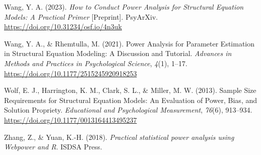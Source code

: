 \documentclass[
  letterpaper,
  DIV=11,
  numbers=noendperiod]{scrartcl}
\newlength{\cslhangindent}
\newenvironment{CSLReferences}[2] %
 {\begin{list}{}{%
  \setlength{\itemindent}{0pt}
  \setlength{\leftmargin}{0pt}
  \setlength{\parsep}{0pt}
  \ifodd #1
   \setlength{\leftmargin}{\cslhangindent}
   \setlength{\itemindent}{-1\cslhangindent}
  \fi
  \setlength{\itemsep}{#2\baselineskip}}}
 {\end{list}}
\begin{document}
\begin{CSLReferences}{1}{0}
Wang, Y. A. (2023). \emph{How to {Conduct Power Analysis} for
{Structural Equation Models}: {A Practical Primer}} {[}Preprint{]}.
PsyArXiv. \url{https://doi.org/10.31234/osf.io/4n3uk}

Wang, Y. A., \& Rhemtulla, M. (2021). Power {Analysis} for {Parameter
Estimation} in {Structural Equation Modeling}: {A Discussion} and
{Tutorial}. \emph{Advances in Methods and Practices in Psychological
Science}, \emph{4}(1), 1--17.
\url{https://doi.org/10.1177/2515245920918253}

Wolf, E. J., Harrington, K. M., Clark, S. L., \& Miller, M. W. (2013).
Sample {Size Requirements} for {Structural Equation Models}: {An
Evaluation} of {Power}, {Bias}, and {Solution Propriety}.
\emph{Educational and Psychological Measurement}, \emph{76}(6),
913--934. \url{https://doi.org/10.1177/0013164413495237}

Zhang, Z., \& Yuan, K.-H. (2018). \emph{Practical statistical power
analysis using {Webpower} and {R}}. ISDSA Press.

\end{CSLReferences}
\end{document}

